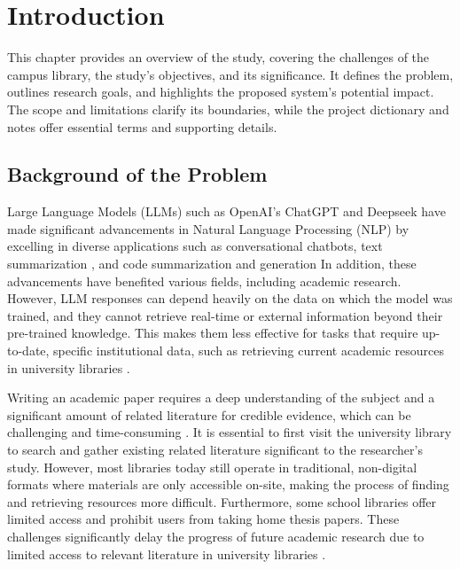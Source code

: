 
\chapter{Introduction}


\hspace{1cm}This chapter provides an overview of the study, covering the challenges of the campus library, the study’s objectives, and its significance. It defines the problem, outlines research goals, and highlights the proposed system’s potential impact. The scope and limitations clarify its boundaries, while the project dictionary and notes offer essential terms and supporting details. 

\begin{refsection}
\section{Background of the Problem}
\hspace{1cm}Large Language Models (LLMs) such as OpenAI's ChatGPT \cite{achiam2023gpt}  and Deepseek \cite{guo2025deepseek} have made significant advancements in Natural Language Processing (NLP) by excelling in diverse applications such as conversational chatbots, text summarization \cite{lewis2019bart}, and code summarization and generation \cite{nijkamp2022codegen,chen2021evaluating}
 In addition, these advancements have benefited various fields, including academic research. However, LLM responses can depend heavily on the data on which the model was trained, and they cannot retrieve real-time or external information beyond their pre-trained knowledge. This makes them less effective for tasks that require up-to-date, specific institutional data, such as retrieving current academic resources in university libraries \cite{liu2024information}.

\bigbreak
\hspace{0.4cm}Writing an academic paper requires a deep understanding of the subject and a significant amount of related literature for credible evidence, which can be challenging and time-consuming \cite{khalifa2024using}. It is essential to first visit the university library to search and gather existing related literature significant to the researcher’s study.  However, most libraries today still operate in traditional, non-digital formats where materials are only accessible on-site, making the process of finding and retrieving resources more difficult. Furthermore, some school libraries offer limited access and prohibit users from taking home thesis papers. These challenges significantly delay the progress of future academic research due to limited access to relevant literature in university libraries \cite{prajapat2022comparative}. 



\end{refsection}

